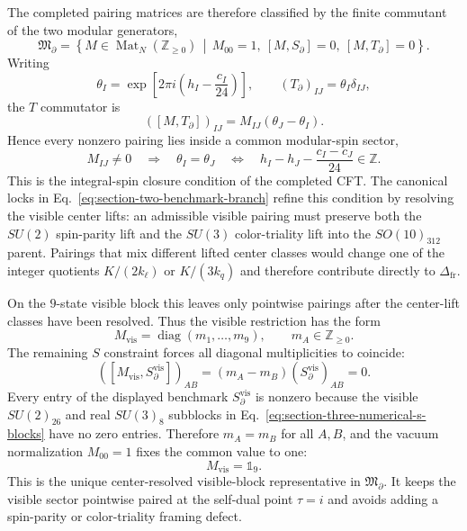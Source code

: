 \documentclass[11pt,letterpaper]{article}
\theoremstyle{plain}
\DeclareMathOperator{\diag}{diag}
\newcommand{\kell}{k_{\ell}}
\newcommand{\kq}{k_q}
\newcommand{\Kpar}{K}
\newcommand{\Deltafr}{\Delta_{\text{fr}}}
\begin{document}
The completed pairing matrices are therefore classified by the finite
commutant of the two modular generators,
\begin{equation}
\label{eq:section-three-pairing-classification-set}
 \mathfrak M_{\partial}
 =
 \left\{
 M\in\operatorname{Mat}_{N}(\mathbb Z_{\ge0})
 \,\middle|\,
 M_{00}=1,\ [M,S_{\partial}]=0,\ [M,T_{\partial}]=0
 \right\}.
\end{equation}
Writing
\begin{equation}
\label{eq:section-three-t-phase}
 \theta_I
 =
 \exp\!\left[2\pi i\left(h_I-\frac{c_I}{24}\right)\right],
 \qquad
 (T_{\partial})_{IJ}=\theta_I\delta_{IJ},
\end{equation}
the $T$ commutator is
\begin{equation}
\label{eq:section-three-t-commutator-entry}
 ([M,T_{\partial}])_{IJ}
 =
 M_{IJ}(\theta_J-\theta_I).
\end{equation}
Hence every nonzero pairing lies inside a common modular-spin sector,
\begin{equation}
\label{eq:section-three-integral-spin-closure}
 M_{IJ}\ne0
 \quad\Longrightarrow\quad
 \theta_I=\theta_J
 \quad\Longleftrightarrow\quad
 h_I-h_J-\frac{c_I-c_J}{24}\in\mathbb Z.
\end{equation}
This is the integral-spin closure condition of the completed CFT.  The
canonical locks in Eq.~\eqref{eq:section-two-benchmark-branch} refine this
condition by resolving the visible center lifts: an admissible visible pairing
must preserve both the $SU(2)$ spin-parity lift and the $SU(3)$ color-triality
lift into the $SO(10)_{312}$ parent.  Pairings that mix different lifted center
classes would change one of the integer quotients
$\Kpar/(2\kell)$ or $\Kpar/(3\kq)$ and therefore contribute directly to
$\Deltafr$.

On the $9$-state visible block this leaves only pointwise pairings after the
center-lift classes have been resolved.  Thus the visible restriction has the
form
\begin{equation}
\label{eq:section-three-visible-diagonal-class}
 M_{\text{vis}}
 =
 \diag(m_1,\ldots,m_9),
 \qquad
 m_A\in\mathbb Z_{\ge0}.
\end{equation}
The remaining $S$ constraint forces all diagonal multiplicities to coincide:
\begin{equation}
\label{eq:section-three-visible-s-diagonal-constraint}
 ([M_{\text{vis}},S_{\partial}^{\text{vis}}])_{AB}
 =
 (m_A-m_B)(S_{\partial}^{\text{vis}})_{AB}=0.
\end{equation}
Every entry of the displayed benchmark $S_{\partial}^{\text{vis}}$ is nonzero
because the visible $SU(2)_{26}$ and real $SU(3)_8$ subblocks in
Eq.~\eqref{eq:section-three-numerical-s-blocks} have no zero entries.
Therefore $m_A=m_B$ for all $A,B$, and the vacuum normalization $M_{00}=1$
fixes the common value to one:
\begin{equation}
\label{eq:section-three-visible-identity-unique}
 \boxed{
 M_{\text{vis}}=\mathbb 1_9.}
\end{equation}
This is the unique center-resolved visible-block representative in
\(\mathfrak M_{\partial}\).  It keeps the visible sector pointwise paired at
the self-dual point $\tau=i$ and avoids adding a spin-parity or color-triality
framing defect.
\end{document}
